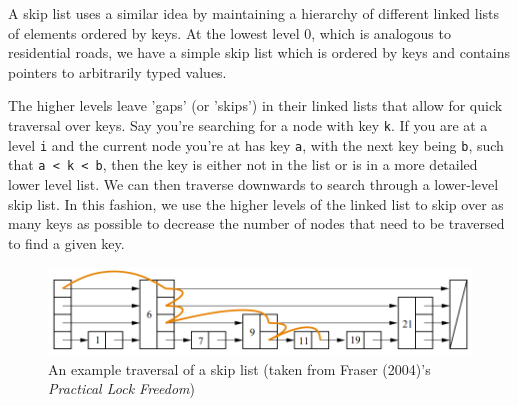 \documentclass[11pt]{article}
\newcommand{\ttt}[1]{\texttt{#1}}
\begin{document}
A skip list uses a similar idea by maintaining a hierarchy of different linked lists of elements ordered by keys. At the lowest level 0, which is analogous to residential roads, we have a simple skip list which is ordered by keys and contains pointers to arbitrarily typed values.

The higher levels leave 'gaps' (or 'skips') in their linked lists that allow for quick traversal over keys. Say you're searching for a node with key \ttt{k}. If you are at a level \ttt{i} and the current node you're at has key \ttt{a}, with the next key being \ttt{b}, such that \ttt{a < k < b}, then the key is either not in the list or is in a more detailed lower level list. We can then traverse downwards to search through a lower-level skip list. In this fashion, we use the higher levels of the linked list to skip over as many keys as possible to decrease the number of nodes that need to be traversed to find a given key. 

\begin{figure}[h!]
\begin{center}
\includegraphics[width=5in]{skiplist_search.png}
\end{center}
\caption{An example traversal of a skip list (taken from Fraser (2004)'s \textit{Practical Lock Freedom})\cite{fraser2004practical}}
\end{figure}

\end{document}
